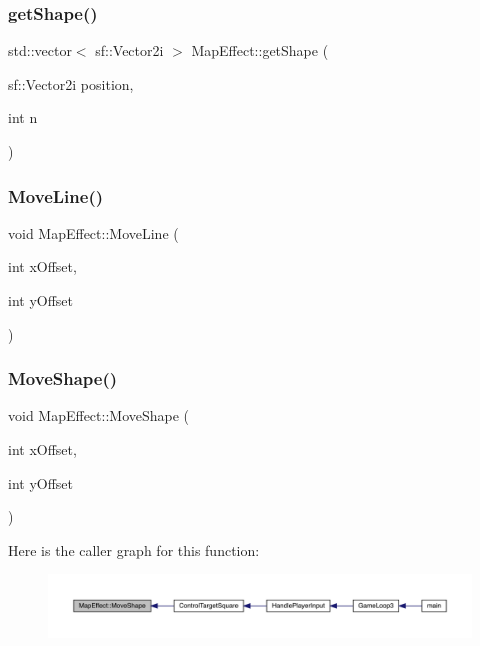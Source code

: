 \subsubsection{\texorpdfstring{get\+Shape()}{getShape()}}
{\footnotesize\ttfamily std\+::vector$<$ sf\+::\+Vector2i $>$ Map\+Effect\+::get\+Shape (\begin{DoxyParamCaption}\item[{sf\+::\+Vector2i}]{position,  }\item[{int}]{n }\end{DoxyParamCaption})}

\mbox{\label{class_map_effect_a0436f9350a55dabc183dd66024dc7895}} 
\subsubsection{\texorpdfstring{Move\+Line()}{MoveLine()}}
{\footnotesize\ttfamily void Map\+Effect\+::\+Move\+Line (\begin{DoxyParamCaption}\item[{int}]{x\+Offset,  }\item[{int}]{y\+Offset }\end{DoxyParamCaption})}

\mbox{\label{class_map_effect_a4a775648e056eda586a1d627467552d7}} 
\subsubsection{\texorpdfstring{Move\+Shape()}{MoveShape()}}
{\footnotesize\ttfamily void Map\+Effect\+::\+Move\+Shape (\begin{DoxyParamCaption}\item[{int}]{x\+Offset,  }\item[{int}]{y\+Offset }\end{DoxyParamCaption})}

Here is the caller graph for this function\+:
\nopagebreak
\begin{figure}[H]
\begin{center}
\leavevmode
\includegraphics[width=350pt]{class_map_effect_a4a775648e056eda586a1d627467552d7_icgraph}
\end{center}
\end{figure}
\mbox{\label{class_map_effect_a4782568b5d45629c080fdf183943ea29}} 
